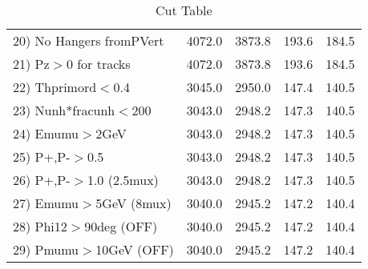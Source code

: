 \begin{table}[h!]
\begin{tabular}{||l||r|r|r|r||}
 20) No Hangers fromPVert &      4072.0 &      3873.8 &       193.6 &       184.5 \\
 21) Pz$>$0 for tracks    &      4072.0 &      3873.8 &       193.6 &       184.5 \\
 22) Thprimord$<$0.4      &      3045.0 &      2950.0 &       147.4 &       140.5 \\
 23) Nunh*fracunh$<$200   &      3043.0 &      2948.2 &       147.3 &       140.5 \\
 24) Emumu$>$2GeV         &      3043.0 &      2948.2 &       147.3 &       140.5 \\
 25) P+,P-$>$0.5          &      3043.0 &      2948.2 &       147.3 &       140.5 \\
 26) P+,P-$>$1.0 (2.5mux) &      3043.0 &      2948.2 &       147.3 &       140.5 \\
 27) Emumu$>$5GeV  (8mux) &      3040.0 &      2945.2 &       147.2 &       140.4 \\
 28) Phi12$>$90deg  (OFF) &      3040.0 &      2945.2 &       147.2 &       140.4 \\
 29) Pmumu$>$10GeV  (OFF) &      3040.0 &      2945.2 &       147.2 &       140.4 \\
 \hline
 \hline
 \end{tabular}
 \caption{Cut Table \cohrp  }
 \label{tab-cut_crhop}
 \end{table}
